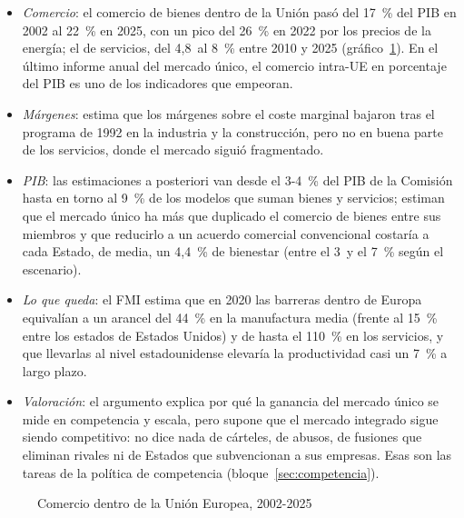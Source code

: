 \documentclass[11pt]{article}
\begin{document}
\begin{itemize}
\item \emph{Comercio}: el comercio de bienes dentro de la Unión pasó del 17~\% del PIB en 2002 al 22~\% en 2025, con un pico del 26~\% en 2022 por los precios de la energía; el de servicios, del 4,8~al 8~\% entre 2010 y 2025 (gráfico~\ref{fig:comercio-intra}). En el último informe anual del mercado único, el comercio intra-UE en porcentaje del PIB es uno de los indicadores que empeoran\nocite{CE2026InformeAnual}.
\item \emph{Márgenes}: \textcite{Badinger2007Has} estima que los márgenes sobre el coste marginal bajaron tras el programa de 1992 en la industria y la construcción, pero no en buena parte de los servicios, donde el mercado siguió fragmentado.
\item \emph{PIB}: las estimaciones a posteriori van desde el 3-4~\% del PIB de la Comisión\nocite{CE2025EstrategiaFicha} hasta en torno al 9~\% de los modelos que suman bienes y servicios\nocite{inTVeld2019Economic}; \textcite{MayerVicardZignago2019Cost} estiman que el mercado único ha más que duplicado el comercio de bienes entre sus miembros y que reducirlo a un acuerdo comercial convencional costaría a cada Estado, de media, un 4,4~\% de bienestar (entre el 3~y el 7~\% según el escenario).
\item \emph{Lo que queda}: el FMI estima que en 2020 las barreras dentro de Europa equivalían a un arancel del 44~\% en la manufactura media (frente al 15~\% entre los estados de Estados Unidos) y de hasta el 110~\% en los servicios, y que llevarlas al nivel estadounidense elevaría la productividad casi un 7~\% a largo plazo\nocite{FMI2024REO,FMI2024Kammer}.
\item \emph{Valoración}: el argumento explica por qué la ganancia del mercado único se mide en competencia y escala, pero supone que el mercado integrado sigue siendo competitivo: no dice nada de cárteles, de abusos, de fusiones que eliminan rivales ni de Estados que subvencionan a sus empresas. Esas son las tareas de la política de competencia (bloque~\ref{sec:competencia}).
\end{itemize}

\begin{figure}[H]
\centering
\caption{Comercio dentro de la Unión Europea, 2002-2025}\label{fig:comercio-intra}
\end{figure}
\end{document}

